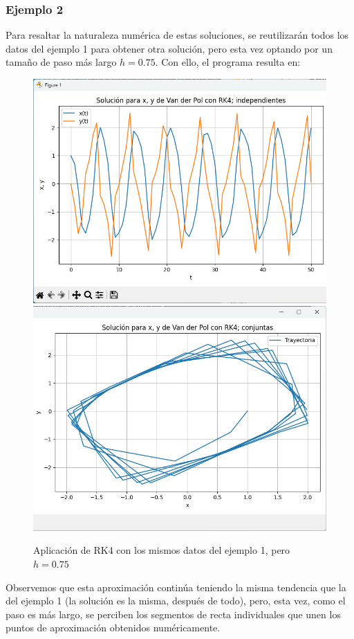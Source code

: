 \subsubsection{Ejemplo 2}

Para resaltar la naturaleza numérica de estas soluciones, se reutilizarán todos los datos del ejemplo 1 para obtener otra solución, pero esta vez optando por un tamaño de paso más largo \(h = 0.75\). Con ello, el programa resulta en:
\begin{figure}[H]
	\centering
	\includegraphics[scale=0.5]{../auxiliary/assets/ejemplo2-indiv.png}
	\includegraphics[scale=0.5]{../auxiliary/assets/ejemplo2-conj.png}
	\caption{Aplicación de RK4 con los mismos datos del ejemplo 1, pero \(h = 0.75\)}
\end{figure}
Observemos que esta aproximación continúa teniendo la misma tendencia que la del ejemplo 1 (la solución es la misma, después de todo), pero, esta vez, como el paso es más largo, se perciben los segmentos de recta individuales que unen los puntos de aproximación obtenidos numéricamente.

